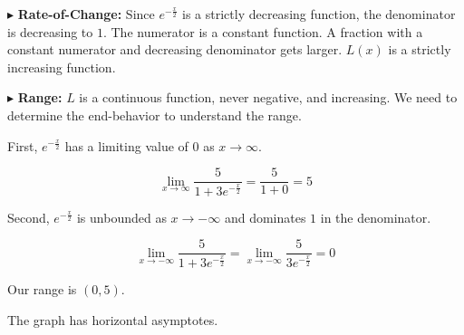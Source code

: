 \documentclass{ximera}
\begin{document}
$\blacktriangleright$ \textbf{Rate-of-Change:}    Since $e^{-\tfrac{x}{2}}$ is a strictly decreasing function, the denominator is decreasing to $1$. The numerator is a constant function. A fraction with a constant numerator and decreasing denominator gets larger. $L(x)$ is a strictly increasing function.






$\blacktriangleright$ \textbf{Range:} $L$ is a continuous function, never negative, and increasing. We need to determine the end-behavior to understand the range.


First, $e^{-\tfrac{x}{2}}$ has a limiting value of $0$ as $x \to \infty$.


\[   \lim_{x \to \infty} \frac{5}{1+3 e^{-\tfrac{x}{2}}} =   \frac{5}{1 + 0}   = 5 \]



Second, $e^{-\tfrac{x}{2}}$ is unbounded as $x \to -\infty$ and dominates $1$ in the denominator.

\[   \lim_{x \to -\infty} \frac{5}{1+3 e^{-\tfrac{x}{2}}} =   \lim_{x \to -\infty} \frac{5}{3 e^{-\tfrac{x}{2}}}   = 0 \]



Our range is $(0, 5)$.


The graph has horizontal asymptotes.
\end{document}
